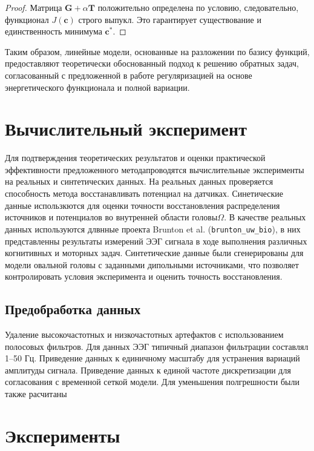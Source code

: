 \documentclass[a4paper,14pt,oneside,openany]{extarticle}
\begin{document}
\begin{proof}
Матрица $\mathbf{G} + \alpha \mathbf{T}$ положительно определена по условию, следовательно, функционал $J(\mathbf{c})$ строго выпукл. Это гарантирует существование и единственность минимума $\mathbf{c}^*$.
\end{proof}

Таким образом, линейные модели, основанные на разложении по базису функций, предоставляют теоретически обоснованный подход к решению обратных задач, согласованный с предложенной в работе регуляризацией на основе энергетического функционала и полной вариации.

\newpage
\section{Вычислительный эксперимент}

Для подтверждения теоретических результатов и оценки практической эффективности предложенного методапроводятся вычислительные эксперименты на реальных и синтетических данных. 
На реальных данных проверяется способность метода восстанавливать потенциал на датчиках. Синетические данные использкются для оценки точности 
восстановления распределения источников и потенциалов во внутренней области головы$\Omega$.
В качестве реальных данных используются длвнные проекта Brunton et al. (\texttt{brunton\_uw\_bio}), в них представленны результаты измерений ЭЭГ сигнала в ходе выполнения различных когнитивных и моторных задач.
Синтетические данные были сгенерированы для модели овальной головы с заданными дипольными источниками, что позволяет контролировать условия эксперимента и оценить точность восстановления.
\subsection{Предобработка данных}

Удаление высокочастотных и низкочастотных артефактов с использованием полосовых фильтров. Для данных ЭЭГ типичный диапазон фильтрации составлял 1–50 Гц.
Приведение данных к единичному масштабу для устранения вариаций амплитуды сигнала.
Приведение данных к единой частоте дискретизации для согласования с временной сеткой модели.
Для уменьшения полгрешности были также расчитаны 

\newpage
\section{Эксперименты}
\label{sec:experiments}
\end{document}
